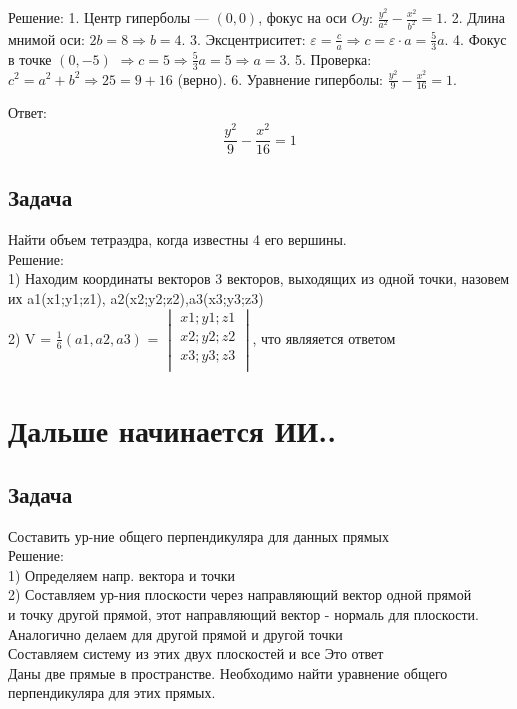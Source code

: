 \documentclass[a4paper,14pt]{extreport} %
\begin{document}
 Решение:   
1. Центр гиперболы — \((0, 0)\), фокус на оси \(Oy\): \(\frac{y^2}{a^2} - \frac{x^2}{b^2} = 1\).  
2. Длина мнимой оси: \(2b = 8 \Rightarrow b = 4\).  
3. Эксцентриситет: \(\varepsilon = \frac{c}{a} \Rightarrow c = \varepsilon \cdot a = \frac{5}{3}a\).  
4. Фокус в точке \((0, -5)\) \(\Rightarrow c = 5 \Rightarrow \frac{5}{3}a = 5 \Rightarrow a = 3\).  
5. Проверка: \(c^2 = a^2 + b^2 \Rightarrow 25 = 9 + 16\) (верно).  
6. Уравнение гиперболы: \(\frac{y^2}{9} - \frac{x^2}{16} = 1\).

 Ответ:   
\[
\boxed{\frac{y^2}{9} - \frac{x^2}{16} = 1}
\]
\section*{Задача}
Найти объем тетраэдра, когда известны 4 его вершины. \\
Решение:\\
1) Находим координаты векторов 3 векторов, выходящих из одной точки, назовем их a1(x1;y1;z1), a2(x2;y2;z2),a3(x3;y3;z3)\\
2) V = $ \frac{1}{6}(a1,a2,a3) $ = $ \begin{vmatrix}
  x1;y1;z1\\
x2;y2;z2\\x3;y3;z3\\
\end{vmatrix} $, что являяется ответом


\chapter{Дальше начинается ИИ..}

\section*{Задача}
Составить ур-ние общего перпендикуляра для данных прямых \\
Решение:\\
1) Определяем напр. вектора и точки \\
2) Составляем ур-ния плоскости через направляющий вектор одной прямой \\
и точку другой прямой, этот направляющий вектор - нормаль для плоскости. \\
Аналогично делаем для другой прямой и другой точки \\
Составляем систему из этих двух плоскостей и все Это ответ \\

Даны две прямые в пространстве. Необходимо найти уравнение общего перпендикуляра для этих прямых. 
\end{document}
